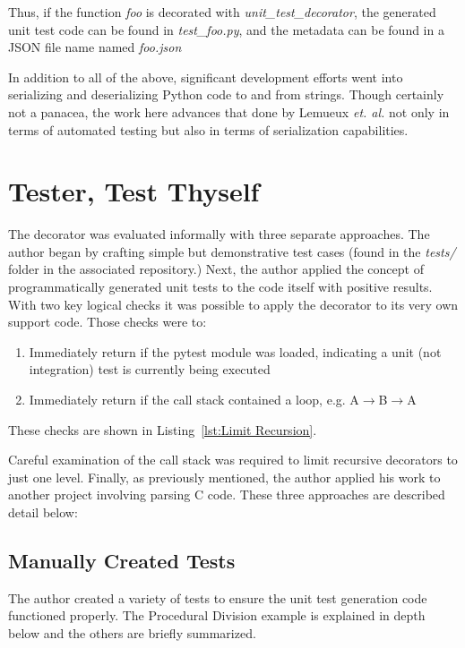 \documentclass[10pt, conference]{IEEEtran}
\begin{document}
Thus, if the function \textit{foo} is decorated with \textit{unit\_test\_decorator},
the generated unit test code can be found in \textit{test\_foo.py}, and the 
metadata can be found in a JSON file name named \textit{foo.json}

In addition to all of the above, significant development efforts went into 
serializing and deserializing Python code to and from strings.  Though
certainly not a panacea, the work here advances that done by 
Lemueux \textit{et. al.} \cite{lemieux2023codamosa} not only in terms of 
automated testing but also in terms of serialization capabilities.




 \section{Tester, Test Thyself}\label{sec:evaluation}

The decorator was evaluated informally with three separate approaches.
The author began by crafting simple but demonstrative test cases 
(found in the \textit{tests/} folder in the associated repository.) Next,
the author applied the concept of programmatically generated unit tests
to the code itself with positive results. With two key logical checks it
was possible to apply the decorator to its very own support code.  Those
checks were to:

\begin{enumerate}
  \item Immediately return if the pytest module was loaded, indicating a unit (not integration) test is currently being executed
  \item Immediately return if the call stack contained a loop, e.g. A$\rightarrow$B$\rightarrow$A
\end{enumerate}

These checks are shown in Listing~\ref{lst:Limit Recursion}.



Careful examination of the call stack was required to limit 
recursive decorators to just one level. Finally, as previously mentioned, 
the author applied his work to another project involving parsing C code. 
These three approaches are described detail below:

\subsection{Manually Created Tests}\label{sec:eval-1}
The author created a variety of tests to ensure the unit test generation 
code functioned properly. The Procedural Division example is explained in depth
below and the others are briefly summarized.
\end{document}
